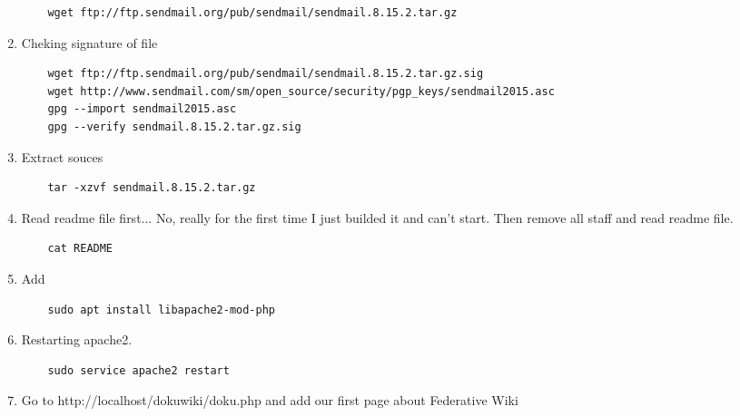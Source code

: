 \documentclass[10pt]{article}
\begin{document}
\begin{enumerate}
    \begin{verbatim}
    wget ftp://ftp.sendmail.org/pub/sendmail/sendmail.8.15.2.tar.gz
    \end{verbatim}
    \item Cheking signature of file
    \begin{verbatim}
    wget ftp://ftp.sendmail.org/pub/sendmail/sendmail.8.15.2.tar.gz.sig
    wget http://www.sendmail.com/sm/open_source/security/pgp_keys/sendmail2015.asc
    gpg --import sendmail2015.asc
    gpg --verify sendmail.8.15.2.tar.gz.sig
    \end{verbatim}
    \item Extract souces
    \begin{verbatim}
    tar -xzvf sendmail.8.15.2.tar.gz
    \end{verbatim}
    \item Read readme file first... No, really for the first time I just builded it and can't start. Then remove all staff and read readme file. 
    \begin{verbatim}
    cat README
    \end{verbatim}
    \item Add 
    \begin{verbatim}
    sudo apt install libapache2-mod-php 
    \end{verbatim}
    \item Restarting apache2. 
    \begin{verbatim}
    sudo service apache2 restart
    \end{verbatim}
    \item Go to http://localhost/dokuwiki/doku.php and add our first page about Federative Wiki
  \end{enumerate}
\end{document}
